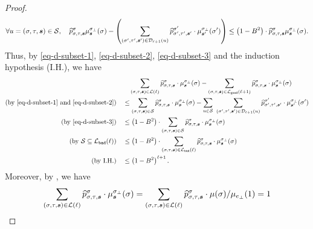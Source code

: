 \documentclass[11pt]{article}
\def\!#1{\mathtt{#1}}
\newcommand{\seqS}{\boldsymbol{s}}
\begin{document}
\begin{proof}
\begin{align}\label{eq-d-subset-3}
\forall u=(\sigma,\tau,\seqS)\in \+S, \quad \widehat{p}^{\sigma}_{\sigma,\tau,\seqS}\mu^{\sigma_{\bot}}_{\seqS}(\sigma) - \left(\sum_{(\sigma',\tau',\seqS')\in \+D_{\ell+1}(u)} \widehat{p}^{\sigma'}_{\sigma',\tau',\seqS'}\cdot \mu^{\sigma_{\bot}}_{\seqS'}(\sigma') \right)\leq \left(1 - B^2\right)\cdot\widehat{p}^{\sigma}_{\sigma,\tau,\seqS}\mu^{\sigma_{\bot}}_{\seqS}(\sigma).
\end{align}
Thus, by \eqref{eq-d-subset-1},  \eqref{eq-d-subset-2}, \eqref{eq-d-subset-3} and the induction hypothesis (I.H.), we have
\begin{equation}\label{eq-d-diff}
\begin{aligned}
 &\quad \sum_{(\sigma,\tau, \seqS)\in \+L(\ell)} \widehat{p}^{\sigma}_{\sigma,\tau,\seqS}\cdot \mu^{\sigma_{\bot}}_{\seqS}(\sigma) - \sum_{(\sigma,\tau, \seqS)\in \+L_{\!{good}}(\ell+1)}\widehat{p}^{\sigma}_{\sigma,\tau,\seqS}\cdot \mu^{\sigma_{\bot}}_{\seqS}(\sigma)\\
\left(\text{by \eqref{eq-d-subset-1} and \eqref{eq-d-subset-2}}\right)\quad &\leq \sum_{(\sigma,\tau,\seqS)\in \+S}\widehat{p}^{\sigma}_{\sigma,\tau,\seqS}\cdot \mu^{\sigma_{\bot}}_{\seqS}(\sigma) - \sum_{u\in \+S}\ \sum_{(\sigma',\tau',\seqS')\in \+D_{\ell+1}(u)} \widehat{p}^{\sigma'}_{\sigma',\tau',\seqS'}\cdot \mu^{\sigma_{\bot}}_{\seqS'}(\sigma') \\
\left(\text{by \eqref{eq-d-subset-3}}\right)\quad &\leq
\left( 1 -B^2\right)\cdot\sum_{(\sigma,\tau,\seqS)\in \+S}\widehat{p}^{\sigma}_{\sigma,\tau,\seqS}\cdot \mu^{\sigma_{\bot}}_{\seqS}(\sigma)\\
\left(\text{by $\+S\subseteq \+L_{\!{bad}}(\ell)$}\right)
\quad &\leq
\left( 1 -B^2\right)\cdot\sum_{(\sigma,\tau,\seqS)\in \+L_{\!{bad}}(\ell)}\widehat{p}^{\sigma}_{\sigma,\tau,\seqS}\cdot \mu^{\sigma_{\bot}}_{\seqS}(\sigma)\\
\left(\text{by I.H.}\right)\quad &\leq \left(1-B^2\right)^{\ell+1}.
\end{aligned}
\end{equation}
Moreover, by , we have
\begin{equation}\label{eq-lemma-ratio-identity-transform}
\begin{aligned}
    \sum_{(\sigma,\tau, \seqS)\in \+L(\ell)} \widehat{p}^{\sigma}_{\sigma,\tau,\seqS}\cdot \mu^{\sigma_{\bot}}_{\seqS}(\sigma) &= \sum_{(\sigma,\tau, \seqS)\in \+L(\ell)}\widehat{p}^{\sigma}_{\sigma,\tau,\seqS}\cdot \mu(\sigma)/\mu_{e_{\bot}}(1) = 1 \\

\end{aligned}
\end{equation}
\end{proof}
\end{document}
